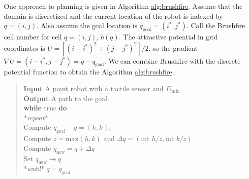 One approach to planning is given in Algorithm
\href{..\%20topic::\%20\%20Discrete\%20potential\%20function\%20planner}{alg:brushfire}.
Assume that the domain is discretized and the current location of the
robot is indexed by \(q = (i,j)\). Also assume the goal location is
\(q_{\text{goal}} = (i^*,j^*)\). Call the Brushfire cell number for cell
\(q = (i,j)\), \(b(q)\). The attractive potential in grid coordinates is
\(U = [(i-i^*)^2 + (j-j^*)^2]/2\), so the gradient
\(\nabla U =  (i-i^*,j-j^*) = q - q_{\text{goal}}\). We can combine
Brushfire with the discrete potential function to obtain the Algorithm
\href{..\%20topic::\%20\%20Discrete\%20potential\%20function\%20planner}{alg:brushfire}.

\begin{quote}
\textbf{Input} A point robot with a tactile sensor and
\(D_\text{min}\).\\
\textbf{Output} A path to the goal.\\
\textbf{while} true \textbf{do}\\
\hspace*{0.333em}\hspace*{0.333em}*\emph{repeat}*\\
\hspace*{0.333em}\hspace*{0.333em}\hspace*{0.333em}\hspace*{0.333em}Compute
\(q_{\text{goal}}-q = (h,k)\).\\
\hspace*{0.333em}\hspace*{0.333em}\hspace*{0.333em}\hspace*{0.333em}Compute
\(z = \text{max}(h,k)\) and
\(\Delta q =  (\text{int } h/z, \text{int } k/z)\)\\
\hspace*{0.333em}\hspace*{0.333em}\hspace*{0.333em}\hspace*{0.333em}Compute
\(q_{\text{new}} = q + \Delta q\)\\
\hspace*{0.333em}\hspace*{0.333em}\hspace*{0.333em}\hspace*{0.333em}Set
\(q_{\text{new}} \to q\)\\
\hspace*{0.333em}\hspace*{0.333em}*\emph{until}* \(q = q_{\text{goal}}\)

\end{quote}
